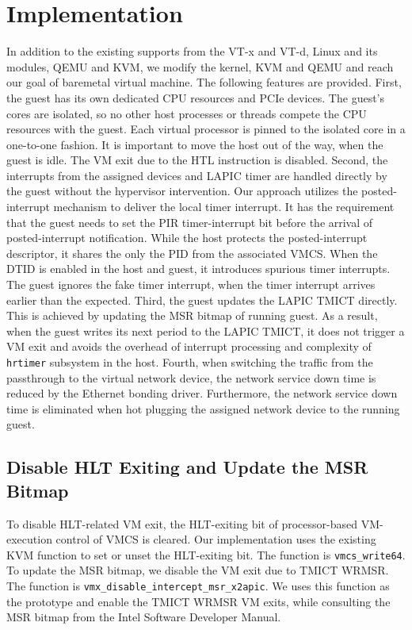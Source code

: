 \section{Implementation}
In addition to the existing supports from the VT-x and VT-d,
Linux and its modules, QEMU and KVM, we modify the kernel, KVM
and QEMU and reach our goal of baremetal virtual machine. The
following features are provided. First, the guest has its own
dedicated CPU resources and PCIe devices. The guest's cores
are isolated, so no other host processes or threads compete
the CPU resources with the guest. Each virtual processor is
pinned to the isolated core in a one-to-one fashion. It is
important to move the host out of the way, when the guest is
idle. The VM exit due to the HTL instruction is disabled.
Second, the interrupts from the assigned devices and LAPIC
timer are handled directly by the guest without the hypervisor
intervention. Our approach utilizes the posted-interrupt
mechanism to deliver the local timer interrupt. It has the
requirement that the guest needs to set the PIR
timer-interrupt bit before the arrival of posted-interrupt
notification. While the host protects the posted-interrupt
descriptor, it shares the only the PID from the associated
VMCS. When the DTID is enabled in the host and guest, it
introduces spurious timer interrupts. The guest ignores the
fake timer interrupt, when the timer interrupt arrives earlier
than the expected. Third, the guest updates the LAPIC TMICT
directly. This is achieved by updating the MSR bitmap of
running guest. As a result, when the guest writes its next
period to the LAPIC TMICT, it does not trigger a VM exit and
avoids the overhead of interrupt processing and complexity of
\texttt{hrtimer} subsystem in the host. Fourth, when switching
the traffic from the passthrough to the virtual network
device, the network service down time is reduced by the
Ethernet bonding driver. Furthermore, the network service down
time is eliminated when hot plugging the assigned network
device to the running guest.

\subsection{Disable HLT Exiting and Update the MSR Bitmap}
To disable HLT-related VM exit, the HLT-exiting bit of
processor-based VM-execution control of VMCS is cleared. Our
implementation uses the existing KVM function to set or unset
the HLT-exiting bit. The function is \texttt{vmcs\_write64}.
To update the MSR bitmap, we disable the VM exit due to TMICT
WRMSR. The function is
\texttt{vmx\_disable\_intercept\_msr\_x2apic}. We uses this
function as the prototype and enable the TMICT WRMSR VM exits,
while consulting the MSR bitmap from the Intel Software
Developer Manual.

